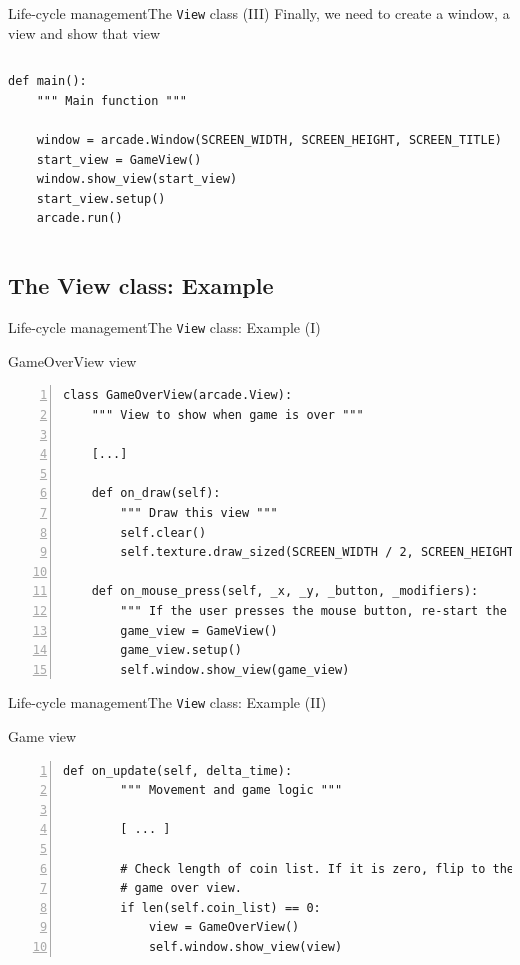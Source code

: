 \documentclass[10pt,compress]{beamer} %
\begin{document}
\begin{frame}[fragile]{Life-cycle management}{The \texttt{View} class (III)}
	Finally, we need to create a window, a view and show that view
	\begin{columns}
 	   \column{\textwidth}
		\begin{exampleblock}{}
			\begin{lstlisting} 
def main():
    """ Main function """

    window = arcade.Window(SCREEN_WIDTH, SCREEN_HEIGHT, SCREEN_TITLE)
    start_view = GameView()
    window.show_view(start_view)
    start_view.setup()
    arcade.run()
\end{lstlisting}
		\end{exampleblock}
	\end{columns}
\end{frame}

\subsection{The View class: Example}

\begin{frame}[fragile]{Life-cycle management}{The \texttt{View} class: Example (I)}
		\begin{exampleblock}{GameOverView view}
			\begin{lstlisting}[numbers=left]
class GameOverView(arcade.View):
    """ View to show when game is over """

    [...]

    def on_draw(self):
        """ Draw this view """
        self.clear()
        self.texture.draw_sized(SCREEN_WIDTH / 2, SCREEN_HEIGHT / 2, SCREEN_WIDTH, SCREEN_HEIGHT)

    def on_mouse_press(self, _x, _y, _button, _modifiers):
        """ If the user presses the mouse button, re-start the game. """
        game_view = GameView()
        game_view.setup()
        self.window.show_view(game_view)
\end{lstlisting}
\end{exampleblock}
\end{frame}

\begin{frame}[fragile]{Life-cycle management}{The \texttt{View} class: Example (II)}
		\begin{exampleblock}{Game view}
			\begin{lstlisting}[numbers=left]
def on_update(self, delta_time):
        """ Movement and game logic """

        [ ... ]

        # Check length of coin list. If it is zero, flip to the
        # game over view.
        if len(self.coin_list) == 0:
            view = GameOverView()
            self.window.show_view(view)
\end{lstlisting}
\end{exampleblock}
\end{frame}
\end{document}
